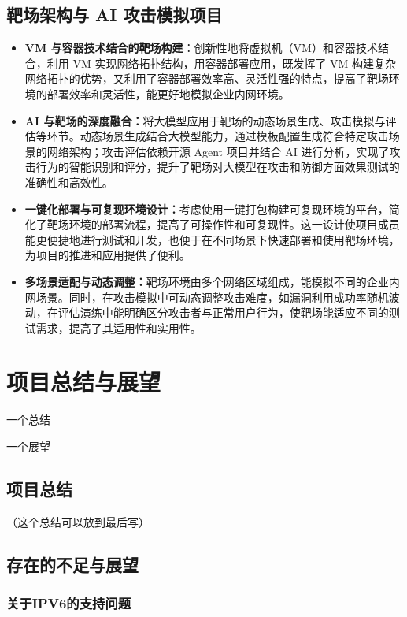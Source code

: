 \documentclass[lang=cn,10pt]{elegantbook}
\begin{document}
\section{靶场架构与 AI 攻击模拟项目}
\begin{itemize}
    \item \textbf{VM 与容器技术结合的靶场构建}：创新性地将虚拟机（VM）和容器技术结合，利用 VM 实现网络拓扑结构，用容器部署应用，既发挥了 VM 构建复杂网络拓扑的优势，又利用了容器部署效率高、灵活性强的特点，提高了靶场环境的部署效率和灵活性，能更好地模拟企业内网环境。
    \item \textbf{AI 与靶场的深度融合：}将大模型应用于靶场的动态场景生成、攻击模拟与评估等环节。动态场景生成结合大模型能力，通过模板配置生成符合特定攻击场景的网络架构；攻击评估依赖开源 Agent 项目并结合 AI 进行分析，实现了攻击行为的智能识别和评分，提升了靶场对大模型在攻击和防御方面效果测试的准确性和高效性。
    \item \textbf{一键化部署与可复现环境设计：}考虑使用一键打包构建可复现环境的平台，简化了靶场环境的部署流程，提高了可操作性和可复现性。这一设计使项目成员能更便捷地进行测试和开发，也便于在不同场景下快速部署和使用靶场环境，为项目的推进和应用提供了便利。
    \item \textbf{多场景适配与动态调整：}靶场环境由多个网络区域组成，能模拟不同的企业内网场景。同时，在攻击模拟中可动态调整攻击难度，如漏洞利用成功率随机波动，在评估演练中能明确区分攻击者与正常用户行为，使靶场能适应不同的测试需求，提高了其适用性和实用性。
\end{itemize}


\chapter{项目总结与展望}
\begin{introduction}
  \item 一个总结
  \item 一个展望
\end{introduction}

\section{项目总结}
（这个总结可以放到最后写）

\section{存在的不足与展望}

\subsection{关于IPV6的支持问题}
\end{document}
